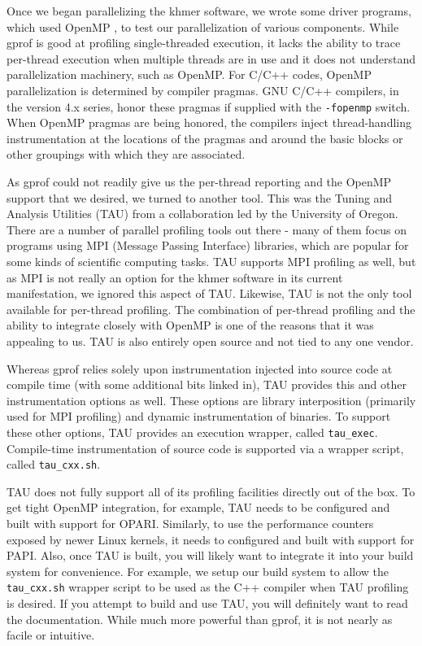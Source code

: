 Once we began parallelizing the khmer software, we wrote some driver programs,
which used OpenMP \citep{web:OpenMP}, to test our parallelization of various
components. While gprof is good at profiling single-threaded execution, it
lacks the ability to trace per-thread execution when multiple threads are in
use and it does not understand parallelization machinery, such as OpenMP. For
C/C++ codes, OpenMP parallelization is determined by compiler pragmas. GNU
C/C++ compilers, in the version 4.x series, honor these pragmas if supplied
with the \texttt{-fopenmp} switch. When OpenMP pragmas are being honored, the
compilers inject thread-handling instrumentation at the locations of the
pragmas and around the basic blocks or other groupings with which they are
associated.

As gprof could not readily give us the per-thread reporting and the OpenMP
support that we desired, we turned to another tool. This was the Tuning and
Analysis Utilities (TAU) \citep{web:TAU} from a collaboration led by the
University of Oregon. There are a number of parallel profiling tools out there
- many of them focus on programs using MPI (Message Passing Interface)
libraries, which are popular for some kinds of scientific computing tasks. TAU
supports MPI profiling as well, but as MPI is not really an option for the
khmer software in its current manifestation, we ignored this aspect of TAU.
Likewise, TAU is not the only tool available for per-thread profiling. The
combination of per-thread profiling and the ability to integrate closely with
OpenMP is one of the reasons that it was appealing to us. TAU is also entirely
open source and not tied to any one vendor.

Whereas gprof relies solely upon instrumentation injected into source code at
compile time (with some additional bits linked in), TAU provides this and other
instrumentation options as well. These options are library interposition
(primarily used for MPI profiling) and dynamic instrumentation of binaries. To
support these other options, TAU provides an execution wrapper, called
\texttt{tau\_exec}. Compile-time instrumentation of source code is supported
via a wrapper script, called \texttt{tau\_cxx.sh}.

TAU does not fully support all of its profiling facilities directly out of the
box. To get tight OpenMP integration, for example, TAU needs to be configured
and built with support for OPARI. Similarly, to use the performance counters
exposed by newer Linux kernels, it needs to configured and built with support
for PAPI. Also, once TAU is built, you will likely want to integrate it into
your build system for convenience. For example, we setup our build system to
allow the \texttt{tau\_cxx.sh} wrapper script to be used as the C++ compiler
when TAU profiling is desired. If you attempt to build and use TAU, you will
definitely want to read the documentation. While much more powerful than gprof,
it is not nearly as facile or intuitive.

